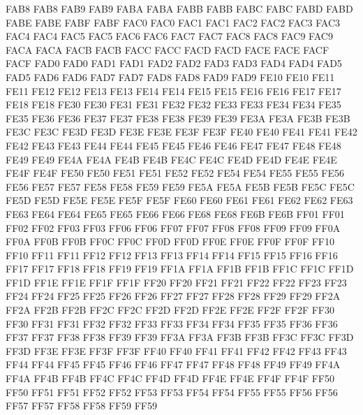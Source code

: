 \ID FAB8 FAB8
\ID FAB9 FAB9
\ID FABA FABA
\ID FABB FABB
\ID FABC FABC
\ID FABD FABD
\ID FABE FABE
\ID FABF FABF
\ID FAC0 FAC0
\ID FAC1 FAC1
\ID FAC2 FAC2
\ID FAC3 FAC3
\ID FAC4 FAC4
\ID FAC5 FAC5
\ID FAC6 FAC6
\ID FAC7 FAC7
\ID FAC8 FAC8
\ID FAC9 FAC9
\ID FACA FACA
\ID FACB FACB
\ID FACC FACC
\ID FACD FACD
\ID FACE FACE
\ID FACF FACF
\ID FAD0 FAD0
\ID FAD1 FAD1
\ID FAD2 FAD2
\ID FAD3 FAD3
\ID FAD4 FAD4
\ID FAD5 FAD5
\ID FAD6 FAD6
\ID FAD7 FAD7
\ID FAD8 FAD8
\ID FAD9 FAD9
\IS FE10 FE10
\CL FE11 FE11
\CL FE12 FE12
\IS FE13 FE13
\IS FE14 FE14
\EX FE15 FE15
\EX FE16 FE16
\OP FE17 FE17
\CL FE18 FE18
\ID FE30 FE30
\ID FE31 FE31
\ID FE32 FE32
\ID FE33 FE33
\ID FE34 FE34
\OP FE35 FE35
\CL FE36 FE36
\OP FE37 FE37
\CL FE38 FE38
\OP FE39 FE39
\CL FE3A FE3A
\OP FE3B FE3B
\CL FE3C FE3C
\OP FE3D FE3D
\CL FE3E FE3E
\OP FE3F FE3F
\CL FE40 FE40
\OP FE41 FE41
\CL FE42 FE42
\OP FE43 FE43
\CL FE44 FE44
\ID FE45 FE45
\ID FE46 FE46
\OP FE47 FE47
\CL FE48 FE48
\ID FE49 FE49
\ID FE4A FE4A
\ID FE4B FE4B
\ID FE4C FE4C
\ID FE4D FE4D
\ID FE4E FE4E
\ID FE4F FE4F
\CL FE50 FE50
\ID FE51 FE51
\CL FE52 FE52
\NS FE54 FE54
\NS FE55 FE55
\EX FE56 FE56
\EX FE57 FE57
\ID FE58 FE58
\OP FE59 FE59
\CL FE5A FE5A
\OP FE5B FE5B
\CL FE5C FE5C
\OP FE5D FE5D
\CL FE5E FE5E
\ID FE5F FE5F
\ID FE60 FE60
\ID FE61 FE61
\ID FE62 FE62
\ID FE63 FE63
\ID FE64 FE64
\ID FE65 FE65
\ID FE66 FE66
\ID FE68 FE68
\ID FE6B FE6B
\EX FF01 FF01
\ID FF02 FF02
\ID FF03 FF03
\ID FF06 FF06
\ID FF07 FF07
\OP FF08 FF08
\CL FF09 FF09
\ID FF0A FF0A
\ID FF0B FF0B
\CL FF0C FF0C
\ID FF0D FF0D
\CL FF0E FF0E
\ID FF0F FF0F
\ID FF10 FF10
\ID FF11 FF11
\ID FF12 FF12
\ID FF13 FF13
\ID FF14 FF14
\ID FF15 FF15
\ID FF16 FF16
\ID FF17 FF17
\ID FF18 FF18
\ID FF19 FF19
\NS FF1A FF1A
\NS FF1B FF1B
\ID FF1C FF1C
\ID FF1D FF1D
\ID FF1E FF1E
\EX FF1F FF1F
\ID FF20 FF20
\ID FF21 FF21
\ID FF22 FF22
\ID FF23 FF23
\ID FF24 FF24
\ID FF25 FF25
\ID FF26 FF26
\ID FF27 FF27
\ID FF28 FF28
\ID FF29 FF29
\ID FF2A FF2A
\ID FF2B FF2B
\ID FF2C FF2C
\ID FF2D FF2D
\ID FF2E FF2E
\ID FF2F FF2F
\ID FF30 FF30
\ID FF31 FF31
\ID FF32 FF32
\ID FF33 FF33
\ID FF34 FF34
\ID FF35 FF35
\ID FF36 FF36
\ID FF37 FF37
\ID FF38 FF38
\ID FF39 FF39
\ID FF3A FF3A
\OP FF3B FF3B
\ID FF3C FF3C
\CL FF3D FF3D
\ID FF3E FF3E
\ID FF3F FF3F
\ID FF40 FF40
\ID FF41 FF41
\ID FF42 FF42
\ID FF43 FF43
\ID FF44 FF44
\ID FF45 FF45
\ID FF46 FF46
\ID FF47 FF47
\ID FF48 FF48
\ID FF49 FF49
\ID FF4A FF4A
\ID FF4B FF4B
\ID FF4C FF4C
\ID FF4D FF4D
\ID FF4E FF4E
\ID FF4F FF4F
\ID FF50 FF50
\ID FF51 FF51
\ID FF52 FF52
\ID FF53 FF53
\ID FF54 FF54
\ID FF55 FF55
\ID FF56 FF56
\ID FF57 FF57
\ID FF58 FF58
\ID FF59 FF59
